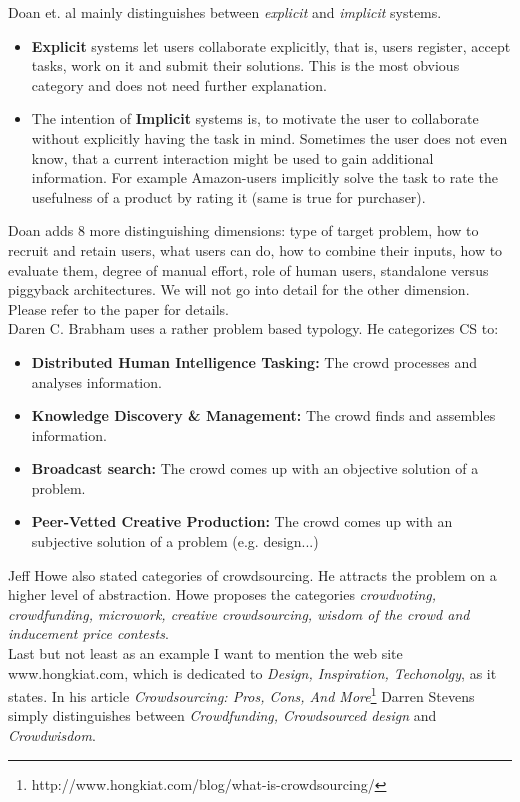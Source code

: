 \documentclass{acm_proc_article-sp}
\begin{document}
Doan et. al \cite{doan:crowd} mainly distinguishes between \textit{explicit} and \textit{implicit} systems.
\begin{itemize}
 \item \textbf{Explicit} systems let users collaborate explicitly, that is, users register, accept tasks, work on it and submit their solutions. This is the most obvious category and does not need further explanation.
 \item The intention of \textbf{Implicit} systems is, to motivate the user to collaborate without explicitly having the task in mind. Sometimes the user does not even know, that a current interaction might be used to gain additional information. For example Amazon-users implicitly solve the task to rate the usefulness of a product by rating it (same is true for purchaser).
\end{itemize}
Doan adds 8 more distinguishing dimensions: type of target problem, how to recruit and retain users, what users can do, how to combine their inputs, how to evaluate them, degree of manual effort, role of human users, standalone versus piggyback architectures. We will not go into detail for the other dimension. Please refer to the paper for details.\\
Daren C. Brabham\cite{brabham:crowd} uses a rather problem based typology. He categorizes CS to:
\begin{itemize}
  \item \textbf{Distributed Human Intelligence Tasking:} The crowd processes and analyses information.
  \item \textbf{Knowledge Discovery \& Management:} The crowd finds and assembles information.
  \item \textbf{Broadcast search:} The crowd comes up with an objective solution of a problem.
  \item \textbf{Peer-Vetted Creative Production:} The crowd comes up with an subjective solution of a problem (e.g. design...)
\end{itemize}
Jeff Howe also stated categories of crowdsourcing. He attracts the problem on a higher level of abstraction. Howe proposes the categories \textit{crowdvoting, crowdfunding, microwork, creative crowdsourcing, wisdom of the crowd and inducement price contests}.\\
Last but not least as an example I want to mention the web site www.hongkiat.com, which is dedicated to \textit{Design, Inspiration, Techonolgy}, as it states. In his article \textit{Crowdsourcing: Pros, Cons, And More}\footnote{http://www.hongkiat.com/blog/what-is-crowdsourcing/} Darren Stevens simply distinguishes between \textit{Crowdfunding, Crowdsourced design} and \textit{Crowdwisdom}.
\end{document}
